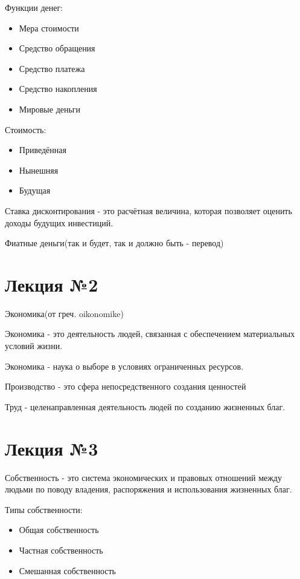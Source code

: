 \documentclass[a4paper, 12pt]{article}
\begin{document}
	Функции денег:
	\begin{itemize}
		\item Мера стоимости
		\item Средство обращения
		\item Средство платежа
		\item Средство накопления
		\item Мировые деньги
	\end{itemize}

	Стоимость:
	\begin{itemize}
		\item Приведённая
		\item Нынешняя
		\item Будущая
	\end{itemize}

	Ставка дисконтирования - это расчётная величина, которая позволяет оценить доходы будущих инвестиций.
	
	Фиатные деньги(так и будет, так и должно быть - перевод)

	\part*{Лекция №2}
	
	Экономика(от греч. oikonomike)
	
	Экономика - это деятельность людей, связанная с обеспечением материальных условий жизни.
	
	Экономика - наука о выборе в условиях ограниченных ресурсов.
	
	Производство - это сфера непосредственного создания ценностей
	
	Труд - целенаправленная деятельность людей по созданию жизненных благ.
	
	\part*{Лекция №3}
	
	Собственность - это система экономических и правовых отношений между людьми по поводу владения, распоряжения и использования жизненных благ.
	
	Типы собственности:
	\begin{itemize}
		\item Общая собственность
		\item Частная собственность
		\item Смешанная собственность
	\end{itemize}
	
\end{document}
